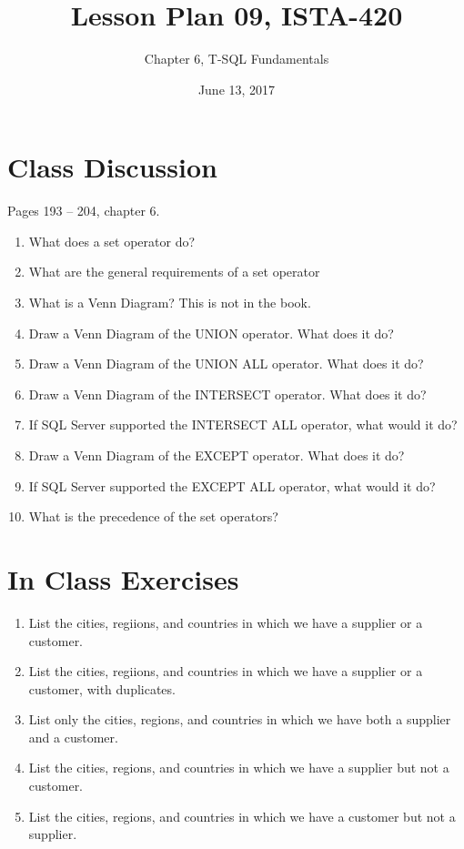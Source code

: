 \documentclass{article}
\title{Lesson Plan 09, ISTA-420}
\author{Chapter 6, T-SQL Fundamentals}
\date{June 13, 2017}
\begin{document}
    

    \maketitle{}

    \section{Class Discussion}

    Pages 193 -- 204, chapter 6.

    \begin{enumerate}
        \item What does a set operator do?
        \item What are the general requirements of a set operator
        \item What is a Venn Diagram? This is not in the book.
        \item Draw a Venn Diagram of the UNION operator. What does it do?
        \item Draw a Venn Diagram of the UNION ALL operator. What does it do?
        \item Draw a Venn Diagram of the INTERSECT operator. What does it do?
        \item If SQL Server supported the INTERSECT ALL operator, what would it do?
        \item Draw a Venn Diagram of the EXCEPT operator. What does it do?
        \item If SQL Server supported the EXCEPT ALL operator, what would it do?
        \item What is the precedence of the set operators?
    \end{enumerate}

    \section{In Class Exercises}

    \begin{enumerate}
        \item List the cities, regiions, and countries in which we have a supplier or a customer. 
        \item List the cities, regiions, and countries in which we have a supplier or a customer, with duplicates.
        \item List only the cities, regions, and countries in which we have both a supplier and a customer. 
        \item List the cities, regions, and countries in which we have a supplier but not a customer. 
        \item List the cities, regions, and countries in which we have a customer but not a supplier. 
    \end{enumerate}
\end{document}
